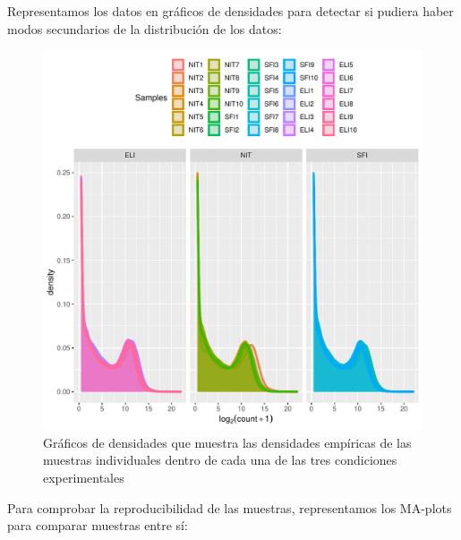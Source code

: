 \documentclass[
  english,
]{article}
\begin{document}
Representamos los datos en gráficos de densidades para detectar si
pudiera haber modos secundarios de la distribución de los datos:

\begin{figure}
\centering
\includegraphics{ortega_rita_ADO_PEC2_files/figure-latex/density_plot-1.pdf}
\caption{Gráficos de densidades que muestra las densidades empíricas de
las muestras individuales dentro de cada una de las tres condiciones
experimentales}
\end{figure}

Para comprobar la reproducibilidad de las muestras, representamos los
MA-plots para comparar muestras entre sí:
\end{document}
